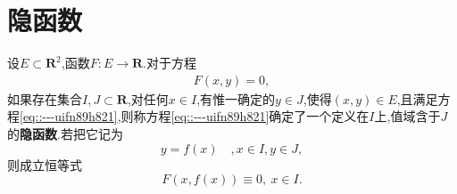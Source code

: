 \documentclass[../../main.tex]{subfiles}%
\begin{document}
\section{隐函数}

\begin{definition}
设$E \subset \mathbf{R}^2$,函数$F:E \to \mathbf{R}$.对于方程
\begin{align}
F(x,y) = 0, \label{eq::---uifn89h821}
\end{align}
如果存在集合$I,J \subset \mathbf{R}$,对任何$x \in I$,有惟一确定的$y \in J$,使得$(x,y) \in E$,且满足方程\eqref{eq::---uifn89h821},则称方程\eqref{eq::---uifn89h821}确定了一个定义在$I$上,值域含于$J$的\textbf{隐函数}.若把它记为
\[
y = f(x) \quad , x \in I, y \in J,
\]
则成立恒等式
\[
F(x,f(x)) \equiv 0,\ x \in I.
\]
\end{definition}
\end{document}
